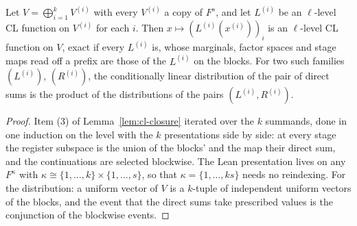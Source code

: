 \begin{lemma}
\label{lem:cl-famsum}
\leanok
Let $V = \bigoplus_{i=1}^{k} V^{(i)}$ with every $V^{(i)}$ a copy of $F^s$, and let $L^{(i)}$
be an $\ell$-level CL function on $V^{(i)}$ for each $i$. Then $x \mapsto (L^{(i)}(x^{(i)}))_i$
is an $\ell$-level CL function on $V$, exact if every $L^{(i)}$ is, whose marginals, factor
spaces and stage maps read off a prefix are those of the $L^{(i)}$ on the blocks. For two such
families $(L^{(i)})$, $(R^{(i)})$, the conditionally linear distribution of the pair of direct
sums is the product of the distributions of the pairs $(L^{(i)}, R^{(i)})$.
\end{lemma}
\begin{proof}
\leanok
Item (3) of Lemma~\ref{lem:cl-closure} iterated over the $k$ summands, done in one induction
on the level with the $k$ presentations side by side: at every stage the register subspace is
the union of the blocks' and the map their direct sum, and the continuations are selected
blockwise. The Lean presentation lives on any $F^\kappa$ with $\kappa \cong \{1, \ldots, k\}
\times \{1, \ldots, s\}$, so that $\kappa = \{1, \ldots, ks\}$ needs no reindexing. For the
distribution: a uniform vector of $V$ is a $k$-tuple of independent uniform vectors of the
blocks, and the event that the direct sums take prescribed values is the conjunction of the
blockwise events.
\end{proof}

